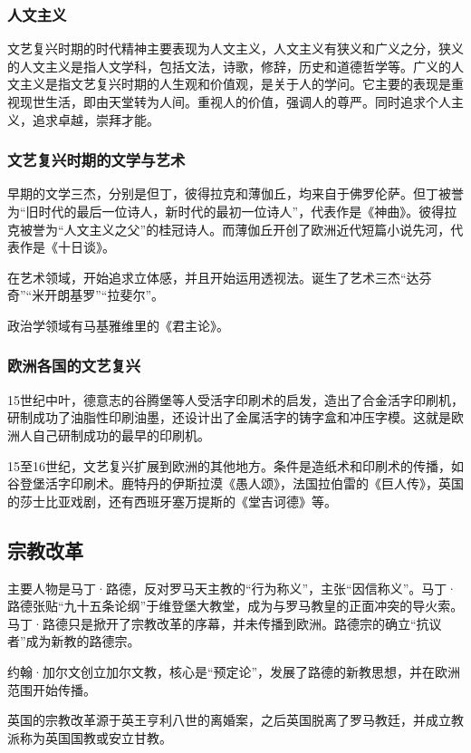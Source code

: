 \subsubsection{人文主义}
文艺复兴时期的时代精神主要表现为人文主义，人文主义有狭义和广义之分，狭义的人文主义是指人文学科，包括文法，诗歌，修辞，历史和道德哲学等。广义的人文主义是指文艺复兴时期的人生观和价值观，是关于人的学问。它主要的表现是重视现世生活，即由天堂转为人间。重视人的价值，强调人的尊严。同时追求个人主义，追求卓越，崇拜才能。

\subsubsection{文艺复兴时期的文学与艺术}
早期的文学三杰，分别是但丁，彼得拉克和薄伽丘，均来自于佛罗伦萨。但丁被誉为“旧时代的最后一位诗人，新时代的最初一位诗人”，代表作是《神曲》。彼得拉克被誉为“人文主义之父”的桂冠诗人。而薄伽丘开创了欧洲近代短篇小说先河，代表作是《十日谈》。

在艺术领域，开始追求立体感，并且开始运用透视法。诞生了艺术三杰“达芬奇”“米开朗基罗”“拉斐尔”。

政治学领域有马基雅维里的《君主论》。

\subsubsection{欧洲各国的文艺复兴}
15世纪中叶，德意志的谷腾堡等人受活字印刷术的启发，造出了合金活字印刷机，研制成功了油脂性印刷油墨，还设计出了金属活字的铸字盒和冲压字模。这就是欧洲人自己研制成功的最早的印刷机。

15至16世纪，文艺复兴扩展到欧洲的其他地方。条件是造纸术和印刷术的传播，如谷登堡活字印刷术。鹿特丹的伊斯拉漠《愚人颂》，法国拉伯雷的《巨人传》，英国的莎士比亚戏剧，还有西班牙塞万提斯的《堂吉诃德》等。

\subsection{宗教改革}
主要人物是马丁·路德，反对罗马天主教的“行为称义”，主张“因信称义”。马丁·路德张贴“九十五条论纲”于维登堡大教堂，成为与罗马教皇的正面冲突的导火索。马丁·路德只是掀开了宗教改革的序幕，并未传播到欧洲。路德宗的确立“抗议者”成为新教的路德宗。

约翰·加尔文创立加尔文教，核心是“预定论”，发展了路德的新教思想，并在欧洲范围开始传播。

英国的宗教改革源于英王亨利八世的离婚案，之后英国脱离了罗马教廷，并成立教派称为英国国教或安立甘教。


